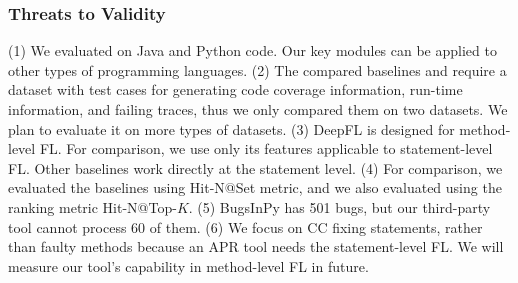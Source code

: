 \subsubsection{Threats to Validity}
(1) We evaluated {\tool} on Java and Python code. Our key modules can
be applied to other types of programming languages. (2) The compared
baselines and {\tool} require a dataset with test cases for generating
code coverage information, run-time information, and failing traces,
thus we only compared them on two datasets. We plan to evaluate it on
more types of datasets. (3) DeepFL is designed for method-level
FL. For comparison, we use only its features applicable to
statement-level FL. Other baselines work directly at the statement level.
(4) For comparison, we evaluated the baselines using Hit-N@Set metric,
and we also evaluated {\tool} using the ranking metric
Hit-N@Top-$K$. (5) BugsInPy has 501 bugs, but our third-party tool cannot
process 60 of them. (6) We focus on CC fixing statements, rather than
faulty methods because an APR tool needs the statement-level FL. We
will measure our tool's capability in method-level FL in future.



